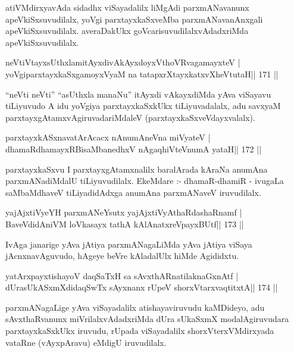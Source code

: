 \begin{artha}
atiVMdirxyavAda sidadhx viSayadalilx liMgAdi parxmANavanunx apeVkiSxsuvudilalx, yoVgi parxtayxkaSxveMba parxmANavanAnxgali apeVkiSxsuvudilalx. averaDakUkx goVcarisuvu\-dilalxvAdadxriMda apeVkiSxsuvudilalx.
\end{artha}

\begin{shl}
neVtiVtayxsUthxlamitAyxdivAkAyxdoyxV\s thoVR\s vagamayxteV |
yoVgiparxtayxkaSxgamoyxV\s yaM na tatapxrXtayxkatxvXheVtutaH\hfill || 171 ||
\end{shl}

\begin{artha}
``neVti neVti'' ``asUthxla manaNu'' itAyxdi vAkayxdiMda yAva viSayavu tiLiyuvudo A idu yoVgiya parxtayxkaSxkUkx tiLiyuvadalalx, adu savxyaM parxtayxgAtamxvAgiruvadariMdaleV (parxtayxkaSxveVdayxvalalx).
\end{artha}

\begin{shl}
parxtayxkASxnavatArAcacx nAnumAneVna miVyateV |
dhamaRdhamayxRBisaMbanedhxV nAgaqhiVteV\s numA yataH\hfill || 172 ||
\end{shl}

\begin{artha}
parxtayxkaSxvu I parxtayxgAtamxnalilx baralArada kAraNa anumAna parxmANadiMdalU tiLiyuvudilalx. EkeMdare :- dhamaR-dhamiR - ivugaLa saMbaMdhaveV tiLiyadidAdxga anumAna parxmANaveV iruvudilalx.
\end{artha}

\begin{shl}
yajAjxtiVyeYH parxmANeYsutx yajAjxtiVyAthaRdashaRnamf |
BaveVdidAniVM loVkasayx tathA kAlAnatxreV\s payxBUtf\hfill || 173 ||
\end{shl}

\begin{artha}
IvAga janarige yAva jAtiya parxmANagaLiMda yAva jAtiya viSaya jAcnxnavAguvudo, hAgeye beVre kAladalUlx hiMde Agididxtu.
\end{artha}

\begin{shl}
yatArxpayxtishayoV daqSaTxH sa sAvxthARnatilaknaGxnAtf |
dUrasUkASxmXdidaqSwTx sAyxnanx rUpeV shorxVtarxvaqtitxtA\hfill || 174 ||
\end{shl}

\begin{artha}
parxmANagaLige yAva viSayadalilx atishayaviruvudu kaMDideyo, adu sAvxthaRvanunx miVrilalxvAdadxriMda dUra sUkaSxmX modalAgiruvudara parxtayxkaSxkUkx iruvudu, rUpada viSayadalilx shorxVterxVMdirxyada vataRne (vAyxpAravu) eMdigU iruvudilalx.
\end{artha}

